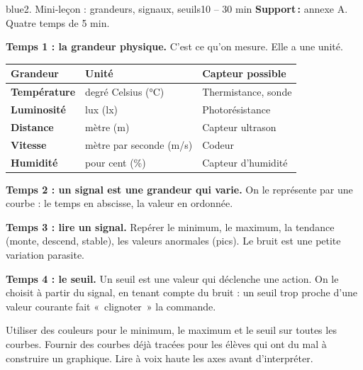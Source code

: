 \documentclass[11pt,a4paper]{article}
\begin{document}
\begin{etape}{blue}{2. Mini-leçon : grandeurs, signaux, seuils}{10 -- 30 min}
\textbf{Support\,:} annexe A. Quatre temps de 5 min.

\textbf{Temps 1 : la grandeur physique.} C'est ce qu'on mesure. Elle a une unité.
\begin{center}
\begin{tabularx}{\linewidth}{>{\bfseries}p{3.4cm}Y Y}
\toprule
Grandeur & Unité & Capteur possible\\
\midrule
Température & degré Celsius (°C) & Thermistance, sonde\\
Luminosité & lux (lx) & Photorésistance\\
Distance & mètre (m) & Capteur ultrason\\
Vitesse & mètre par seconde (m/s) & Codeur\\
Humidité & pour cent (\%) & Capteur d'humidité\\
\bottomrule
\end{tabularx}
\end{center}

\textbf{Temps 2 : un signal est une grandeur qui varie.} On le représente par une courbe : le temps en abscisse, la valeur en ordonnée.

\textbf{Temps 3 : lire un signal.} Repérer le minimum, le maximum, la tendance (monte, descend, stable), les valeurs anormales (pics). Le bruit est une petite variation parasite.

\begin{center}
\end{center}

\textbf{Temps 4 : le seuil.} Un seuil est une valeur qui déclenche une action. On le choisit à partir du signal, en tenant compte du bruit : un seuil trop proche d'une valeur courante fait «~clignoter~» la commande.

\begin{astuce}
Utiliser des couleurs pour le minimum, le maximum et le seuil sur toutes les courbes. Fournir des courbes déjà tracées pour les élèves qui ont du mal à construire un graphique. Lire à voix haute les axes avant d'interpréter.
\end{astuce}
\end{etape}
\end{document}

